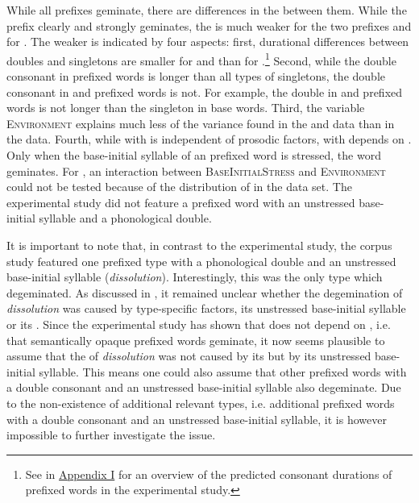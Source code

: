 While all prefixes geminate, there are differences in the  between them. While the prefix  clearly and strongly geminates, the  is much weaker for the two prefixes and for . The weaker  is indicated by four aspects: first, durational differences between doubles and singletons are smaller for  and  than for .\footnote{See  in \hyperref[Appendix I: Predicted Durations Experiment]{Appendix I} for an overview of the predicted consonant durations of prefixed words in the experimental study.} Second, while the double consonant in prefixed words is longer than all types of singletons, the double consonant in  and prefixed words is not. For example, the double in  and prefixed words is not longer than the singleton in base words. Third, the variable \textsc{Environment} explains much less of the variance found in the  and data than in the data. 
Fourth, while  with  is independent of prosodic factors,  with  depends on . Only when the base-initial syllable of an prefixed word is stressed, the word geminates. For , an interaction between \textsc{BaseInitialStress} and \textsc{Environment} could not be tested because of the distribution of  in the data set. The experimental study did not feature a prefixed word with an unstressed base-initial syllable and a phonological double.

It is important to note that, in contrast to the experimental study, the corpus study featured one prefixed type with a phonological double and an unstressed base-initial syllable (\textit{dissolution}). Interestingly, this was the only type which degeminated. As discussed in , it remained unclear whether the de\-gemination of \textit{dissolution} was caused by type-specific factors, its unstressed base-initial syllable or its .
Since the experimental study has shown that  does not depend on , i.e. that semantically opaque prefixed words geminate,  it now seems plausible to assume that the  of \textit{dissolution} was not  caused by its  but by its unstressed base-initial syllable. This means one could also assume that other prefixed words with a double consonant and an unstressed base-initial syllable also degeminate. Due to the non-existence of additional relevant types, i.e. additional prefixed words with a double consonant and an unstressed base-initial syllable, it is however impossible to further investigate the issue. 




